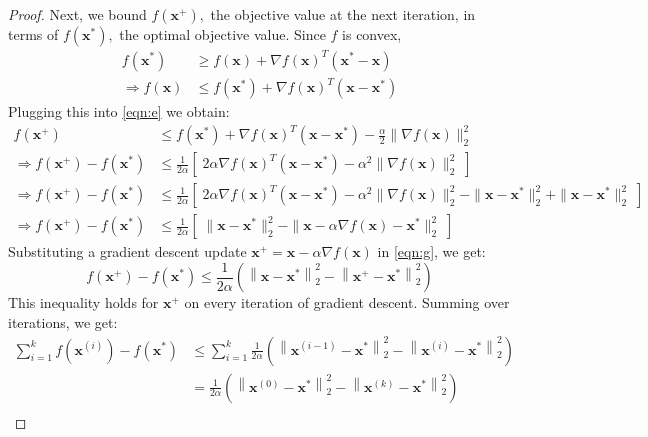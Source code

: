 \documentclass[12pt]{report}
\numberwithin{equation}{section}
\begin{document}
\begin{proof}
\noindent Next, we bound $f\left(\bm{x}^{+}\right),$ the objective value at the next iteration, in terms of $f\left(\bm{x}^{*}\right),$ the optimal objective value. Since $f$ is convex, 
\begin{equation}\label{eqn:f}
\begin{split}
f(\bm{x}^{*}) &\geq f(\bm{x})+\nabla f(\bm{x})^{T}(\bm{x}^{*}-\bm{x}) \\
\Longrightarrow f(\bm{x}) &\leq f(\bm{x}^{*})+\nabla f(\bm{x})^{T}(\bm{x}-\bm{x}^{*})
\end{split}
\end{equation}
Plugging this into \eqref{eqn:e} we obtain:
\begin{equation}\label{eqn:g}
\begin{split}
f(\bm{x}^{+})  & \leq f(\bm{x}^{*})+\nabla f(\bm{x})^{T}(\bm{x}-\bm{x}^{*})- \frac{\alpha}{2}\|\nabla f(\bm{x})\|_{2}^{2} \\
\Longrightarrow f(\bm{x}^{+})-f(\bm{x}^{*}) & \leq \frac{1}{2 \alpha}\left[\; 2 \alpha \nabla f(\bm{x})^{T}(\bm{x}-\bm{x}^{*})-\alpha^{2}\|\nabla f(\bm{x})\|_{2}^{2}\;\right] \\
\Longrightarrow f(\bm{x}^{+})-f(\bm{x}^{*}) & \leq \frac{1}{2 \alpha}\left[\; 2 \alpha \nabla f(\bm{x})^{T}(\bm{x}-\bm{x}^{*})-\alpha^{2}\|\nabla f(\bm{x})\|_{2}^{2}-\|\bm{x}-\bm{x}^{*}\|_{2}^{2}+\|\bm{x}-\bm{x}^{*}\|_{2}^{2}\;\right] \\
\Longrightarrow f(\bm{x}^{+})-f(\bm{x}^{*}) & \leq \frac{1}{2 \alpha}\left[\; \|\bm{x}-\bm{x}^{*}\|_{2}^{2}-\|\bm{x}-\alpha \nabla f(\bm{x})-\bm{x}^{*}\|_{2}^{2}\;\right] 
\end{split}
\end{equation}
Substituting a gradient descent update $\bm{x}^{+}=\bm{x}-\alpha \nabla f(\bm{x})$ in \eqref{eqn:g}, we get:
\begin{equation}
f\left(\bm{x}^{+}\right)-f\left(\bm{x}^{*}\right) \leq \frac{1}{2 \alpha}\left(\left\|\bm{x}-\bm{x}^{*}\right\|_{2}^{2}-\left\|\bm{x}^{+}-\bm{x}^{*}\right\|_{2}^{2}\right)
\end{equation}
This inequality holds for $\bm{x}^{+}$ on every iteration of gradient descent. Summing over iterations, we get:
\begin{equation}
\begin{split}
\sum_{i=1}^{k} f(\bm{x}^{(i)})- f(\bm{x}^{*}) & \leq \sum_{i=1}^{k} \frac{1}{2 \alpha}\left(\left\|\bm{x}^{(i-1)}-\bm{x}^{*}\right\|_{2}^{2}-\left\|\bm{x}^{(i)}-\bm{x}^{*}\right\|_{2}^{2}\right) \\
&=\frac{1}{2 \alpha}\left(\left\|\bm{x}^{(0)}-\bm{x}^{*}\right\|_{2}^{2}-\left\|\bm{x}^{(k)}-\bm{x}^{*}\right\|_{2}^{2}\right) \\

\end{split}
\end{equation}
\end{proof}
\end{document}
